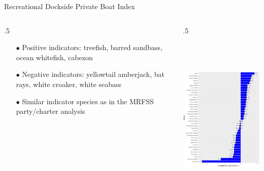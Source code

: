 \documentclass[ignorenonframetext,]{beamer}
\def\begincols{\begin{columns}}
\def\begincol{\begin{column}}
\def\endcol{\end{column}}
\def\endcols{\end{columns}}
\begin{document}

\begin{frame}{Recreational Dockside Private Boat Index}

\begincols
 \begincol{.5\textwidth}

\begin{itemize}
\item[$\bullet$] Positive indicators: treefish, barred sandbass, ocean whitefish, cabezon
\item[$\bullet$] Negative indicators: yellowtail amberjack, bat rays, white croaker, white seabass
\item[$\bullet$] Similar indicator species as in the MRFSS party/charter analysis
\end{itemize}

\endcol
 \begincol{.5\textwidth}

\centering
\includegraphics[height=8cm]{Figures/Fleet4_RecPR_SMcoef.png}

\endcol
\endcols

\end{frame}
\end{document}
